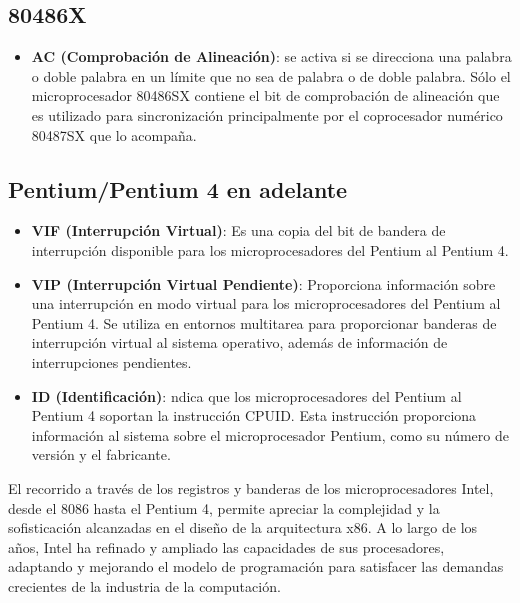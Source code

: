 	\subsection{80486X}

	\begin{itemize}
		\item \textbf{AC (Comprobación de Alineación)}: se activa si se direcciona una palabra
			o doble palabra en un límite que no sea de palabra o de doble palabra. Sólo el
			microprocesador 80486SX contiene el bit de comprobación de alineación que es
			utilizado para sincronización principalmente por el coprocesador numérico
			80487SX que lo acompaña.
	\end{itemize}

	\subsection{Pentium/Pentium 4 en adelante}

	\begin{itemize}
		\item \textbf{VIF (Interrupción Virtual)}: Es una copia del bit de bandera de interrupción
			disponible para los microprocesadores del Pentium al Pentium 4.

		\item \textbf{VIP (Interrupción Virtual Pendiente)}: Proporciona información sobre
			una interrupción en modo virtual para los microprocesadores del Pentium al Pentium
			4. Se utiliza en entornos multitarea para proporcionar banderas de interrupción
			virtual al sistema operativo, además de información de interrupciones
			pendientes.

		\item \textbf{ID (Identificación)}: ndica que los microprocesadores del Pentium al
			Pentium 4 soportan la instrucción CPUID. Esta instrucción proporciona
			información al sistema sobre el microprocesador Pentium, como su número de versión
			y el fabricante.
	\end{itemize}

	\clearpage

	El recorrido a través de los registros y banderas de los microprocesadores Intel, desde
	el 8086 hasta el Pentium 4, permite apreciar la complejidad y la sofisticación
	alcanzadas en el diseño de la arquitectura x86. A lo largo de los años, Intel ha
	refinado y ampliado las capacidades de sus procesadores, adaptando y mejorando el modelo
	de programación para satisfacer las demandas crecientes de la industria de la computación.

